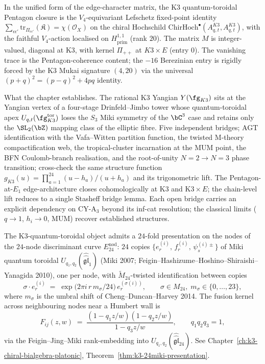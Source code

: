 \begin{remark}
\label{rem:k3qt-V4-equivariant}
In the unified form of the edge-character matrix, the K$3$
quantum-toroidal Pentagon closure is the $V_4$-equivariant Lefschetz
fixed-point identity
$\sum_{\epsilon\epsilon'} \mathrm{tr}_{\Pi_{\epsilon\epsilon'}}(\mathfrak{K})
= \chi(\mathcal{O}_X)$ on the chiral Hochschild
$\mathrm{ChirHoch}^\bullet(A^{K3}_{q,t}, A^{K3}_{q,t})$, with the
faithful $V_4$-action localised on $H^{1,1}_{\mathrm{prim}}$
(rank $20$). The matrix $M$ is integer-valued, diagonal at K$3$,
with kernel $\Pi_{++}$ at $K3 \times E$ (entry $0$). The vanishing
trace is the Pentagon-coherence content; the $-16$ Berezinian entry
is rigidly forced by the K$3$ Mukai signature $(4, 20)$ via the
universal $(p+q)^2 = (p-q)^2 + 4pq$ identity.
\end{remark}

\medskip

What the chapter establishes. The rational K$3$ Yangian
$Y(\fg_{K3})$ sits at the Yangian vertex of a four-stage
Drinfeld--Jimbo tower whose quantum-toroidal apex
$U_{q,t}(\fg_{K3}^{\mathrm{tor}})$ loses the $S_3$ Miki symmetry of the
$\bC^3$ case and retains only the $\SL_2(\bZ)$ mapping class of the
elliptic fibre. Five independent bridges; AGT identification with
the Vafa--Witten partition function, the twisted M-theory
compactification web, the tropical-cluster incarnation at the MUM
point, the BFN Coulomb-branch realisation, and the root-of-unity
$N = 2 \to N = 3$ phase transition; cross-check the same structure
function $g_{K3}(u) = \prod_{a=1}^{24}(u - h_a)/(u + h_a)$ and its
trigonometric lift. The Pentagon-at-$E_1$ edge-architecture closes
cohomologically at K$3$ and K$3 \times E$; the chain-level lift reduces
to a single Stasheff bridge lemma. Each open bridge carries an explicit
dependency on CY-A$_3$ beyond its inf-cat resolution; the classical
limits ($q \to 1$, $h_i \to 0$, MUM) recover established structures.

\begin{remark}
\label{rem:k3qt-24miki-M24-umbral}
The K3-quantum-toroidal object admits a $24$-fold presentation on the nodes of the
$24$-node discriminant curve $E^{\mathrm{nod}}_{24}$: $24$ copies
$\{e^{(i)}_r,\,f^{(i)}_r,\,\psi^{(i)\pm}_s\}$ of Miki quantum toroidal
$U_{q_1,q_2}(\widehat{\widehat{\mathfrak{gl}}}_1)$ (Miki 2007;
Feigin--Hashizume--Hoshino--Shiraishi--Yanagida 2010), one per node, with
$\widetilde{M}_{24}$-twisted identification between copies
\[
 \sigma\cdot e^{(i)}_r
 \;=\;
 \exp\!\bigl(2\pi i\, r\, m_\sigma/24\bigr)\, e^{(\sigma(i))}_r,
 \qquad \sigma\in M_{24},\;m_\sigma\in\{0,\dots,23\},
\]
where $m_\sigma$ is the umbral shift of Cheng--Duncan--Harvey 2014. The fusion
kernel across neighbouring nodes near a Humbert wall is
\[
 F_{ij}(z,w)
 \;=\;
 \frac{(1-q_1 z/w)(1-q_2 z/w)}{1-q_3 z/w},\qquad q_1 q_2 q_3 = 1,
\]
via the Feigin--Jing--Miki rank-embedding into
$U_{q_1,q_2}(\widehat{\widehat{\mathfrak{gl}}}_{24})$. See
Chapter~\ref{ch:k3-chiral-bialgebra-platonic},
Theorem~\ref{thm:k3-24miki-presentation}.
\end{remark}

